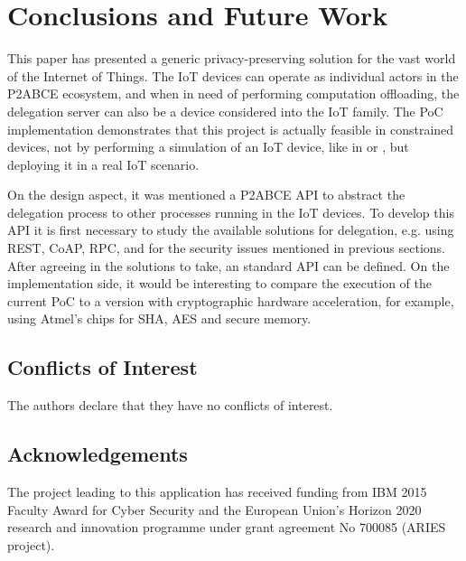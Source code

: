 \section{Conclusions and Future Work}\label{ch:conclusions}

This paper has presented a generic privacy-preserving solution for the vast world of the Internet of Things. The IoT devices can operate as individual actors in the P2ABCE ecosystem, and when in need of performing computation offloading, the delegation server can also be a device considered into the IoT family.
The PoC implementation demonstrates that this project is actually feasible in constrained devices, not by performing a simulation of an IoT device, like in \cite{vanet} or \cite{alcaide2013anonymous}, but deploying it in a real IoT scenario.

On the design aspect, it was mentioned a P2ABCE API to abstract the delegation process to other processes running in the IoT devices. To develop this API it is first necessary to study the available solutions for delegation, e.g. using REST, CoAP, RPC, and for the security issues mentioned in previous sections. After agreeing in the solutions to take, an standard API can be defined. 
On the implementation side, it would be interesting to compare the execution of the current PoC to a version with cryptographic hardware acceleration, for example, using Atmel's chips for SHA, AES and secure memory.


\subsection*{Conflicts of Interest}

The authors declare that they have no conflicts of interest.

\subsection*{Acknowledgements}

The project leading to this application has received funding from IBM 2015 Faculty Award for Cyber Security and the European Union’s Horizon 2020 research and innovation programme under grant agreement No 700085 (ARIES project).
